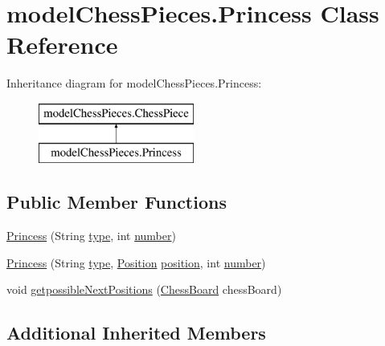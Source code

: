 \hypertarget{classmodel_chess_pieces_1_1_princess}{\section{model\+Chess\+Pieces.\+Princess Class Reference}
\label{classmodel_chess_pieces_1_1_princess}
}
Inheritance diagram for model\+Chess\+Pieces.\+Princess\+:\begin{figure}[H]
\begin{center}
\leavevmode
\includegraphics[height=2.000000cm]{classmodel_chess_pieces_1_1_princess}
\end{center}
\end{figure}
\subsection*{Public Member Functions}
\begin{DoxyCompactItemize}
\item 
\hyperlink{classmodel_chess_pieces_1_1_princess_a33cb1197bcb1f8808ea931626f2cf90b}{Princess} (String \hyperlink{classmodel_chess_pieces_1_1_chess_piece_a195487ca88c197af7c1604247be31db2}{type}, int \hyperlink{classmodel_chess_pieces_1_1_chess_piece_a979e63b99128333883acedc38d25dc87}{number})
\item 
\hyperlink{classmodel_chess_pieces_1_1_princess_a4c6de589407a7e236d78a89cffd41b97}{Princess} (String \hyperlink{classmodel_chess_pieces_1_1_chess_piece_a195487ca88c197af7c1604247be31db2}{type}, \hyperlink{classmodel_core_1_1_position}{Position} \hyperlink{classmodel_chess_pieces_1_1_chess_piece_a3d4362d5b28f6edb14161196d9c6807d}{position}, int \hyperlink{classmodel_chess_pieces_1_1_chess_piece_a979e63b99128333883acedc38d25dc87}{number})
\item 
void \hyperlink{classmodel_chess_pieces_1_1_princess_a89d58dde4ddbbe32cab724f3bb9a2da5}{getpossible\+Next\+Positions} (\hyperlink{classmodel_core_1_1_chess_board}{Chess\+Board} chess\+Board)
\end{DoxyCompactItemize}
\subsection*{Additional Inherited Members}


